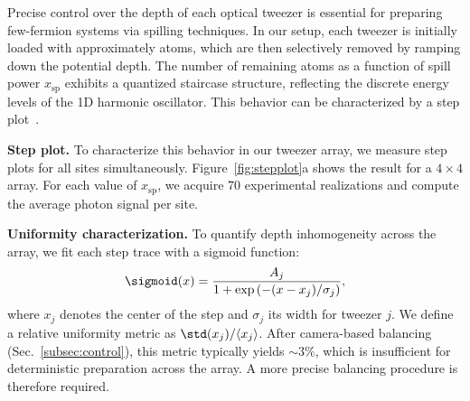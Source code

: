 Precise control over the depth of each optical tweezer is essential for preparing few-fermion systems via spilling techniques. In our setup, each tweezer is initially loaded with approximately  atoms, which are then selectively removed by ramping down the potential depth. The number of remaining atoms as a function of spill power $x_{\mathrm{sp}}$ exhibits a quantized staircase structure, reflecting the discrete energy levels of the 1D harmonic oscillator. This behavior can be characterized by a step plot~\cite{holten_pauli_2022}.

\textbf{Step plot.}
To characterize this behavior in our tweezer array, we measure step plots for all sites simultaneously. Figure~\ref{fig:stepplot}a shows the result for a $4 \times 4$ array. For each value of $x_{\mathrm{sp}}$, we acquire 70 experimental realizations and compute the average photon signal per site. 

\textbf{Uniformity characterization.}
To quantify depth inhomogeneity across the array, we fit each step trace with a sigmoid function:
\begin{equation*}
    \sigmoid(x) = \frac{A_j}{1 + \exp\left(-(x - x_j)/\sigma_j\right)},
\end{equation*}
where $x_j$ denotes the center of the step and $\sigma_j$ its width for tweezer $j$. We define a relative uniformity metric as $\std(x_j) / \langle x_j \rangle$. After camera-based balancing (Sec.~\ref{subsec:control}), this metric typically yields $\sim 3\%$, which is insufficient for deterministic preparation across the array. A more precise balancing procedure is therefore required.




